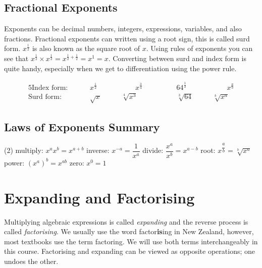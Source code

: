 \subsection*{Fractional Exponents}
Exponents can be decimal numbers, integers, expressions, variables, and also fractions. Fractional exponents can written using a root sign, this is called surd form. $x^{\frac{1}{2}}$ is also known as the square root of $x$. Using rules of exponents you can see that $x^{\frac{1}{2}}\times x^{\frac{1}{2}}=x^{\frac{1}{2}+\frac{1}{2}}=x^1=x$. Converting between surd and index form is quite handy, especially when we get to differentiation using the power rule.
\begin{tcolorbox}\begin{alignat*}{5}\textrm{Index form: }\qquad&x^{\frac{1}{2}}&\qquad\qquad x^{\frac{3}{4}} &\qquad\qquad 64^{\frac{1}{3}}&\qquad\qquad x^\frac{a}{b}\\
\textrm{Surd form: }\qquad&\sqrt{x}&\qquad \sqrt[4]{x^3}&\qquad\qquad\sqrt[3]{64}&\qquad \sqrt[b]{x^a}
\end{alignat*}\end{tcolorbox}

\subsection*{Laws of Exponents Summary}
\begin{tcolorbox}
\begin{tasks}[style=itemize](2)
	\task[] multiply: $ x^a x^b = x^{a+b}$
	\task[] inverse: $x^{-a}  =\dfrac{1}{x^a} $
	\task[] divide: $ \dfrac{x^a}{x^b}  =x^{a-b} $
	\task[] root: $ x^{\dfrac{a}{b}}  =\sqrt[b]{x^a}$
	\task[] power: $\displaystyle (x^a)^b  =x^{ab} $
	\task[] zero: $x^0  =1 $
\end{tasks}	
\end{tcolorbox}
	
\section*{Expanding and Factorising}
Multiplying algebraic expressions is called \emph{expanding} and the reverse process is called \emph{factorising}. We usually use the word factor\textbf{is}ing in New Zealand, however, most textbooks use the term factoring. We will use both terms interchangeably in this course. Factorising and expanding can be viewed as opposite operations; one undoes the other.  


